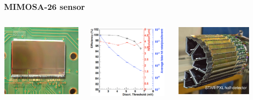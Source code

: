 \documentclass{beamer}
\begin{document}

\begin{frame}
  \frametitle{MIMOSA-26 sensor}

  \vspace{-0.5cm}
  \begin{columns}[c]
    \begin{column}{4cm}
      \begin{center}
        \includegraphics[width = 4.0cm,height=3.6cm]{Pictures/mi26.jpg}
      \end{center}
    \end{column}

    \begin{column}{4cm}
      \begin{center}
        \includegraphics[width = 4.0cm]{Pictures/efficiency_mi26.png}

      \end{center}
    \end{column}
    \begin{column}{4cm}
      \begin{center}
        \includegraphics[width = 4.0cm, height=3.6cm]{Pictures/pxlFinal_sideView_smallSize.jpg}
      \end{center}
    \end{column}
  \end{columns}


\end{frame}
\end{document}
